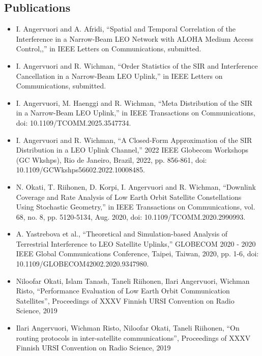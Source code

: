 \documentclass{article}
\begin{document}
        
        
        \subsection{Publications}
        

        \begin{itemize}
        \item
          I. Angervuori and A. Afridi, ``Spatial and Temporal Correlation of the Interference in a Narrow-Beam LEO Network with ALOHA Medium Access Control,,'' in IEEE Letters on Communications, submitted.
        \item
          I. Angervuori and R. Wichman, ``Order Statistics of the SIR and Interference Cancellation in a Narrow-Beam LEO Uplink,'' in IEEE Letters on Communications, submitted.
        \item
I. Angervuori, M. Haenggi and R. Wichman, ``Meta Distribution of the SIR in a Narrow-Beam LEO Uplink,'' in IEEE Transactions on Communications, doi: 10.1109/TCOMM.2025.3547734.
        \item
          I. Angervuori and R. Wichman, ``A Closed-Form Approximation of the SIR Distribution in a LEO Uplink Channel,'' 2022 IEEE Globecom Workshops (GC Wkshps), Rio de Janeiro, Brazil, 2022, pp. 856-861, doi: 10.1109/GCWkshps56602.2022.10008485.
        \item
          N. Okati, T. Riihonen, D. Korpi, I. Angervuori and R. Wichman, ``Downlink Coverage and Rate Analysis of Low Earth Orbit Satellite Constellations Using Stochastic Geometry,'' in IEEE Transactions on Communications, vol. 68, no. 8, pp. 5120-5134, Aug. 2020, doi: 10.1109/TCOMM.2020.2990993.
        \item A. Yastrebova et al., ``Theoretical and Simulation-based Analysis of Terrestrial Interference to LEO Satellite Uplinks,'' GLOBECOM 2020 - 2020 IEEE Global Communications Conference, Taipei, Taiwan, 2020, pp. 1-6, doi: 10.1109/GLOBECOM42002.2020.9347980.
        \item Niloofar Okati, Islam Tanash, Taneli Riihonen, Ilari Angervuori, Wichman Risto, ``Performance Evaluation of Low Earth Orbit Communication Satellites'', Proceedings of XXXV Finnish URSI Convention on Radio Science, 2019
        \item Ilari Angervuori, Wichman Risto, Niloofar Okati, Taneli Riihonen, ``On routing protocols in inter-satellite communications'', Proceedings of XXXV Finnish URSI Convention on Radio Science, 2019
          
        \end{itemize}
\end{document}
